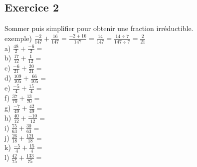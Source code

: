 \documentclass{article}
\begin{document}
\subsection*{Exercice 2}
Sommer puis simplifier pour obtenir une fraction irréductible.\\
exemple) $\frac{-2}{147}+\frac{16}{147}=\frac{-2+16}{147}=\frac{14}{147}=\frac{14\div7}{147\div7}=\frac{2}{21}$\\ 
\vspace{10 mm}
a) $\frac{48}{2}+\frac{-6}{2}=$\\ 
\vspace{10 mm}
b) $\frac{17}{12}+\frac{1}{12}=$\\ 
\vspace{10 mm}
c) $\frac{-6}{21}+\frac{20}{21}=$\\ 
\vspace{10 mm}
d) $\frac{109}{105}+\frac{66}{105}=$\\ 
\vspace{10 mm}
e) $\frac{-5}{4}+\frac{15}{4}=$\\ 
\vspace{10 mm}
f) $\frac{37}{70}+\frac{13}{70}=$\\ 
\vspace{10 mm}
g) $\frac{-7}{49}+\frac{42}{49}=$\\ 
\vspace{10 mm}
h) $\frac{40}{12}+\frac{-10}{12}=$\\ 
\vspace{10 mm}
i) $\frac{75}{63}+\frac{30}{63}=$\\ 
\vspace{10 mm}
j) $\frac{26}{18}+\frac{121}{18}=$\\ 
\vspace{10 mm}
k) $\frac{-5}{4}+\frac{15}{4}=$\\ 
\vspace{10 mm}
l) $\frac{42}{75}+\frac{133}{75}=$\\ 
\vspace{10 mm}
\newpage
\end{document}
